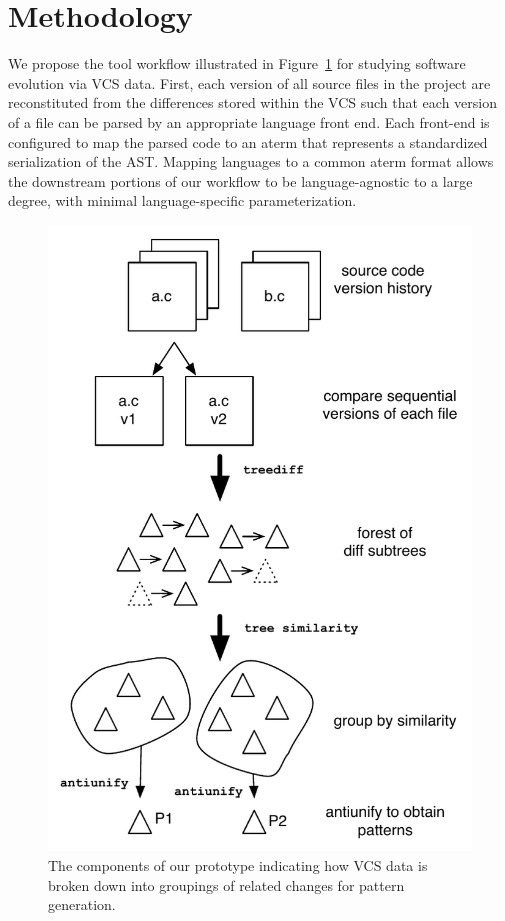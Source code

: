 \section{Methodology}
\label{sec:method}

We propose the tool workflow illustrated in Figure~\ref{fig:workflow} for
studying software evolution via VCS data. First, each version of all source
files in the project are reconstituted from the differences stored within the
VCS such that each version of a file can be parsed by an appropriate language
front end.  Each front-end is configured to map the parsed code to an aterm
that represents a standardized serialization of the AST\@.  Mapping languages
to a common aterm format allows the downstream portions of our workflow to be
language-agnostic to a large degree, with minimal language-specific
parameterization.

\begin{figure}[htb]
\begin{center}
\includegraphics[height=0.44\textheight]{figures/workflow.pdf}
\caption{The components of our prototype indicating how VCS data is
broken down into groupings of related changes for pattern generation.}
\label{fig:workflow}
\end{center}
\end{figure}

